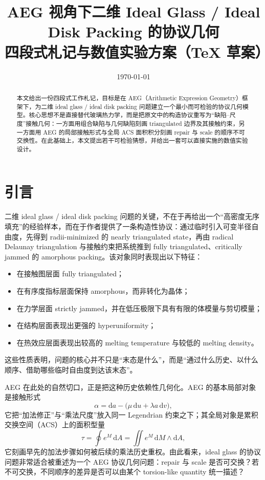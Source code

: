 \documentclass[12pt]{ctexart}
\title{AEG 视角下二维 Ideal Glass / Ideal Disk Packing 的协议几何\\
四段式札记与数值实验方案（\TeX{} 草案）}
\author{}
\date{\today}
\newcommand{\dd}{\mathrm{d}}
\begin{document}
\maketitle

\begin{abstract}
本文给出一份四段式工作札记，目标是在 AEG（Arithmetic Expression Geometry）框架下，为二维 ideal glass / ideal disk packing 问题建立一个最小而可检验的协议几何模型。核心思想不是直接替代玻璃热力学，而是把原文中的构造协议重写为“缺陷--尺度”接触几何：一方面用组合缺陷与几何缺陷刻画 triangulated 边界及其接触约束，另一方面用 AEG 的局部接触形式与全局 ACS 面积积分刻画 repair 与 scale 的顺序不可交换性。在此基础上，本文提出若干可检验猜想，并给出一套可以直接实施的数值实验设计。
\end{abstract}

\tableofcontents

\section{引言}

二维 ideal glass / ideal disk packing 问题的关键，不在于再给出一个“高密度无序填充”的经验样本，而在于作者提供了一条构造性协议：通过临时引入可变半径自由度，先得到 radii-minimized 的 nearly triangulated state，再由 radical Delaunay triangulation 与接触约束把系统推到 fully triangulated、critically jammed 的 amorphous packing。该对象同时表现出以下特征：
\begin{itemize}
    \item 在接触图层面 fully triangulated；
    \item 在有序度指标层面保持 amorphous，而非转化为晶体；
    \item 在力学层面 strictly jammed，并在低压极限下具有有限的体模量与剪切模量；
    \item 在结构层面表现出更强的 hyperuniformity；
    \item 在热效应层面表现出较高的 melting temperature 与较低的 melting density。
\end{itemize}
这些性质表明，问题的核心并不只是“末态是什么”，而是“通过什么历史、以什么顺序、借助哪些临时自由度到达该末态”。

AEG 在此处的自然切口，正是把这种历史依赖性几何化。AEG 的基本局部对象是接触形式
\begin{equation}
\alpha = \dd a - \bigl(\mu\,\dd u + \lambda a\,\dd v\bigr),
\end{equation}
它把“加法修正”与“乘法尺度”放入同一 Legendrian 约束之下；其全局对象是累积交换空间（ACS）上的面积型量
\begin{equation}
\tau = \oint e^{M}\,\dd A = \iint e^{M}\,\dd M \wedge \dd A,
\end{equation}
它刻画早先的加法步骤如何被后续的乘法历史重权。由此看来，ideal glass 的协议问题非常适合被重述为一个 AEG 协议几何问题：repair 与 scale 是否可交换？若不可交换，不同顺序的差异是否可以由某个 torsion-like quantity 统一描述？
\end{document}
